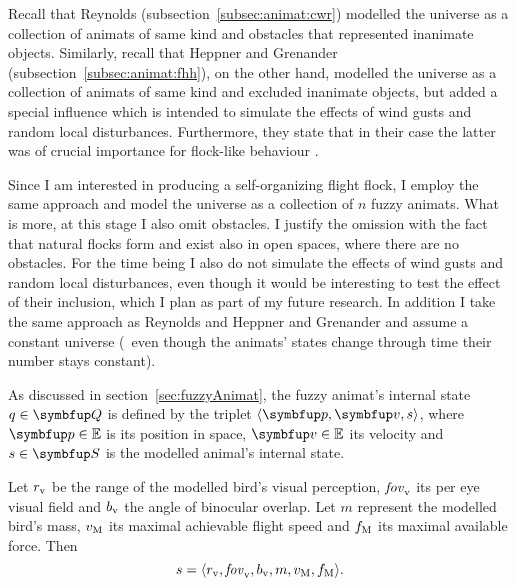 Recall that Reynolds \cite{reynolds:1987} (subsection~\ref{subsec:animat:cwr}) modelled the universe as a collection of animats of same kind and obstacles that represented inanimate objects. Similarly, recall that Heppner and Grenander \cite{heppner:1990} (subsection~\ref{subsec:animat:fhh}), on the other hand, modelled the universe as a collection of animats of same kind and excluded inanimate objects, but added a special influence which is intended to simulate the effects of wind gusts and random local disturbances. Furthermore, they state that in their case the latter was of crucial importance for flock-like behaviour \cite{heppner:1990}.

Since I am interested in producing a self-organizing flight flock, I employ the same approach and model the universe as a collection of $n$ fuzzy animats. What is more, at this stage I also omit obstacles. I justify the omission with the fact that natural flocks form and exist also in open spaces, where there are no obstacles. For the time being I also do not simulate the effects of wind gusts and random local disturbances, even though it would be interesting to test the effect of their inclusion, which I plan as part of my future research. In addition I take the same approach as Reynolds \cite{reynolds:1987,reynolds:1999} and Heppner and Grenander \cite{heppner:1990} and assume a constant universe (\ie\ even though the animats' states change through time their number stays constant).

As discussed in section~\ref{sec:fuzzyAnimat}, the fuzzy animat's internal state $q \in \set{Q}$ is defined by the triplet $\langle \vect{p}, \vect{v}, s \rangle$, where $\vect{p} \in \E$ is its position in space, $\vect{v} \in \E$ its velocity and $s \in \set{S}$ is the modelled animal's internal state. 

\begin{definition}
	\label{def:fuzzyAnimat:s:afd}
	Let $r_\textnormal{v}$ be the range of the modelled bird's visual perception, $\mathit{fov}_\textnormal{v}$ its per eye visual field and $b_\textnormal{v}$ the angle of binocular overlap. Let $m$ represent the modelled bird's mass, $v_\textnormal{M}$ its maximal achievable flight speed and $f_\textnormal{M}$ its maximal available force. Then 
	\begin{equation}
		s=\langle r_\textnormal{v}, \mathit{fov}_\textnormal{v}, b_\textnormal{v}, m, v_\textnormal{M}, f_\textnormal{M} \rangle.
	\end{equation}
\end{definition}

